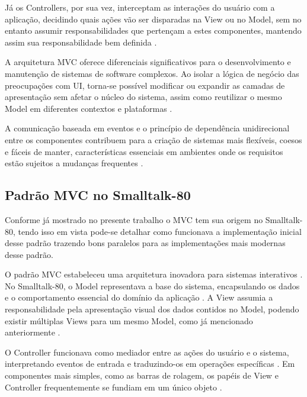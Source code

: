     \par Já os Controllers, por sua vez, interceptam as interações do usuário com a aplicação, decidindo quais ações vão ser disparadas na View ou no Model, sem no entanto assumir responsabilidades que pertençam a estes componentes, mantendo assim sua responsabilidade bem definida \cite{artigo:deacon:2009}.
        
    \par A arquitetura MVC oferece diferenciais significativos para o desenvolvimento e manutenção de sistemas de software complexos. Ao isolar a lógica de negócio das preocupações com UI, torna-se possível modificar ou expandir as camadas de apresentação sem afetar o núcleo do sistema, assim como reutilizar o mesmo Model em diferentes contextos e plataformas \cite{artigo:deacon:2009}.
    
    \par A comunicação baseada em eventos e o princípio de dependência unidirecional entre os componentes contribuem para a criação de sistemas mais flexíveis, coesos e fáceis de manter, características essenciais em ambientes onde os requisitos estão sujeitos a mudanças frequentes \cite{artigo:deacon:2009}.

    \subsection{Padrão MVC no Smalltalk-80}
    
        \par Conforme já mostrado no presente trabalho o MVC tem sua origem no Smalltalk-80, tendo isso em vista pode-se detalhar como funcionava a implementação inicial desse padrão trazendo bons paralelos para as implementações mais modernas desse padrão.
    
        \par O padrão MVC estabeleceu uma arquitetura inovadora para sistemas interativos \cite{artigo:reenskaug:2003}. No Smalltalk-80, o Model representava a base do sistema, encapsulando os dados e o comportamento essencial do domínio da aplicação \cite{artigo:reenskaug:2003}. A View assumia a responsabilidade pela apresentação visual dos dados contidos no Model, podendo existir múltiplas Views para um mesmo Model, como já mencionado anteriormente \cite{artigo:reenskaug:2003}.
        
        \par O Controller funcionava como mediador entre as ações do usuário e o sistema, interpretando eventos de entrada e traduzindo-os em operações específicas \cite{artigo:reenskaug:2003}. Em componentes mais simples, como as barras de rolagem, os papéis de View e Controller frequentemente se fundiam em um único objeto \cite{artigo:reenskaug:2003}.
    
